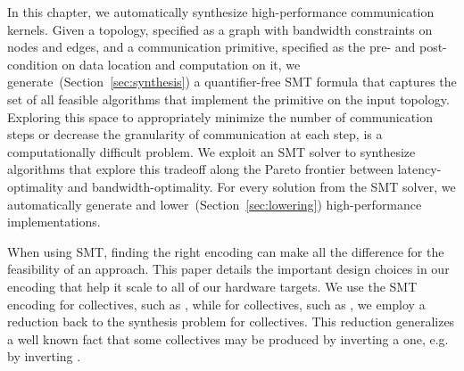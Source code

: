 In this chapter, we automatically synthesize high-performance communication kernels.
Given a topology, specified as a graph with bandwidth constraints on nodes and edges, and a communication primitive, specified as the pre- and post-condition on data location and computation on it, we generate~(Section~\ref{sec:synthesis}) a quantifier-free SMT formula that captures the set of all feasible algorithms that implement the primitive on the input topology.
Exploring this space to appropriately minimize the number of communication steps or decrease the granularity of communication at each step, is a computationally difficult problem. We exploit
an SMT solver to synthesize algorithms that explore this tradeoff along the Pareto frontier between latency-optimality and bandwidth-optimality.
For every solution from the SMT solver, we automatically generate and lower~(Section~\ref{sec:lowering}) high-performance implementations.



When using SMT, finding the right encoding can make all the difference for the
feasibility of an approach. This paper details the important design choices in
our encoding that help it scale to all of our hardware targets. We use the SMT
encoding for \broadcasting collectives, such as \broadcast, while for \reducing
collectives, such as \reduce, we employ a reduction back to the synthesis
problem for \broadcasting collectives.
This reduction generalizes a well known fact that some \reducing collectives may
be produced by inverting a \broadcasting one, e.g. \reduce by inverting \broadcast.


